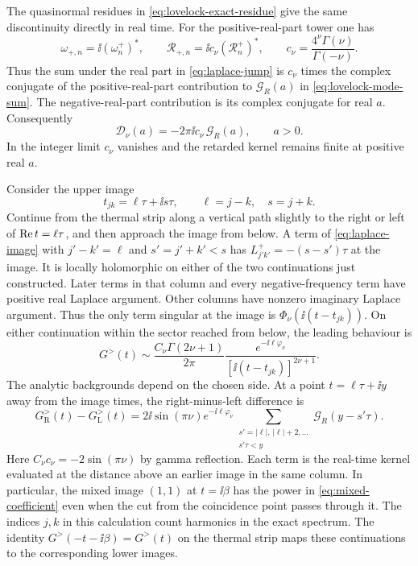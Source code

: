The quasinormal residues in \eqref{eq:lovelock-exact-residue}
give the same discontinuity directly in real time. For the
positive-real-part tower one has
\begin{equation}
 \omega_{+,n}=\ii(\omega_n^+)^*,\qquad
 \mathcal R_{+,n}=\ii c_\nu(\mathcal R_n^+)^*,\qquad
 c_\nu=\frac{4^\nu\Gamma(\nu)}{\Gamma(-\nu)} .
\end{equation}
Thus the sum under the real part in
\eqref{eq:laplace-jump} is \(c_\nu\) times the complex
conjugate of the positive-real-part contribution to
\(\mathcal G_R(a)\) in \eqref{eq:lovelock-mode-sum}.
The negative-real-part contribution is its complex conjugate
for real \(a\). Consequently
\begin{equation}
 \mathcal D_\nu(a)=-2\pi\ii c_\nu\,\mathcal G_R(a),
 \qquad a>0 .
 \label{eq:laplace-jump-retarded}
\end{equation}
In the integer limit \(c_\nu\) vanishes and the retarded kernel
remains finite at positive real \(a\).

Consider the upper image
\begin{equation}
 t_{jk}=\ell\tau+\ii s\tau,\qquad \ell=j-k,\quad s=j+k .
 \label{eq:upper-image-time}
\end{equation}
Continue from the thermal strip along a vertical path slightly to the
right or left of \({\rm Re}\,t=\ell\tau\), and then approach the
image from below. A term of \eqref{eq:laplace-image} with
\(j'-k'=\ell\) and \(s'=j'+k'<s\) has
\(L^+_{j'k'}=-(s-s')\tau\) at the image. It is locally holomorphic on
either of the two continuations just constructed. Later terms in
that column and every negative-frequency term have positive real
Laplace argument. Other columns have nonzero imaginary Laplace
argument. Thus the only term singular at the image is
\(\Phi_\nu(\ii(t-t_{jk}))\). On either continuation within the
sector reached from below, the leading behaviour is
\begin{equation}
 G^>(t)\sim
 \frac{C_\nu\Gamma(2\nu+1)}{2\pi}
 \frac{e^{-\ii\ell\varphi_\nu}}{[\ii(t-t_{jk})]^{2\nu+1}}.
 \label{eq:mixed-coefficient}
\end{equation}
The analytic backgrounds depend on the chosen side. At a point
\(t=\ell\tau+\ii y\) away from the image times, the right-minus-left
difference is
\begin{equation}
 G^>_{\mathrm R}(t)-G^>_{\mathrm L}(t)
 =2\ii\sin(\pi\nu)e^{-\ii\ell\varphi_\nu}
 \sum_{\substack{s'=|\ell|,\,|\ell|+2,\ldots\\ s'\tau<y}}
    \mathcal G_R(y-s'\tau).
 \label{eq:image-jump}
\end{equation}
Here \(C_\nu c_\nu=-2\sin(\pi\nu)\) by gamma reflection.
Each term is the real-time kernel evaluated at the distance
above an earlier image in the same column.
In particular, the mixed image \((1,1)\) at \(t=\ii\beta\) has
the power in \eqref{eq:mixed-coefficient} even when the cut from the
coincidence point passes through it. The indices \(j,k\) in this
calculation count harmonics in the exact spectrum.
The identity \(G^>(-t-\ii\beta)=G^>(t)\) on the thermal strip
maps these continuations to the corresponding lower images.

